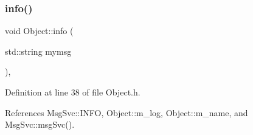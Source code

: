 \subsubsection{\texorpdfstring{info()}{info()}\hspace{0.1cm}{\footnotesize\ttfamily [1/2]}}
{\footnotesize\ttfamily void Object\+::info (\begin{DoxyParamCaption}\item[{std\+::string}]{mymsg }\end{DoxyParamCaption})\hspace{0.3cm}{\ttfamily [inline]}, {\ttfamily [inherited]}}



Definition at line 38 of file Object.\+h.



References Msg\+Svc\+::\+I\+N\+FO, Object\+::m\+\_\+log, Object\+::m\+\_\+name, and Msg\+Svc\+::msg\+Svc().




